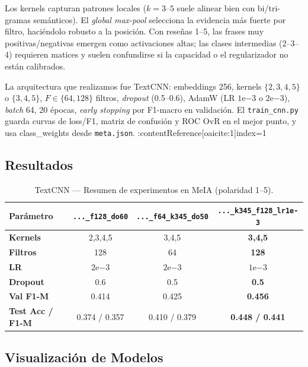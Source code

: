 Los kernels capturan patrones locales ($k{=}3$–$5$ suele alinear bien con bi/tri-gramas semánticos). El \emph{global max-pool} selecciona la evidencia más fuerte por filtro, 
haciéndolo robusto a la posición. Con reseñas 1–5, las frases muy positivas/negativas emergen como activaciones altas; las clases intermedias (2–3–4) requieren matices y suelen 
confundirse si la capacidad o el regularizador no están calibrados.

La arquitectura que realizamos fue TextCNN: embeddings 256, kernels $\{2,3,4,5\}$ o $\{3,4,5\}$, $F\in\{64,128\}$ filtros, \emph{dropout} (0.5–0.6), AdamW (LR $1\mathrm{e}{-3}$ o $2\mathrm{e}{-3}$), \emph{batch} 64, 20 épocas, 
\emph{early stopping} por F1-macro en validación. El \texttt{train\_cnn.py} guarda curvas de loss/F1, matriz de confusión y ROC OvR en el mejor punto, y usa 
class\_weights desde \texttt{meta.json}. :contentReference[oaicite:1]{index=1}

\subsection{Resultados}
\begin{table}[h!]
\centering
\caption{TextCNN — Resumen de experimentos en MeIA (polaridad 1–5).}
\label{tab:cnn_meia_transposed}
\begin{tabular}{lccc}
\toprule
\textbf{Parámetro} & \texttt{...\_f128\_do60} & \texttt{...\_f64\_k345\_do50} & \textbf{\texttt{...\_k345\_f128\_lr1e-3}} \\
\midrule
\textbf{Kernels}          & 2,3,4,5         & 3,4,5               & \textbf{3,4,5} \\
\textbf{Filtros}          & 128             & 64                  & \textbf{128} \\
\textbf{LR}               & $2\mathrm{e}{-3}$ & $2\mathrm{e}{-3}$   & \textbf{$1\mathrm{e}{-3}$} \\
\textbf{Dropout}          & 0.6             & 0.5                 & \textbf{0.5} \\
\textbf{Val F1-M}         & 0.414           & 0.425               & \textbf{0.456} \\
\textbf{Test Acc / F1-M}  & 0.374 / 0.357   & 0.410 / 0.379       & \textbf{0.448 / 0.441} \\
\bottomrule
\end{tabular}
\end{table}

\subsection{Visualización de Modelos}


